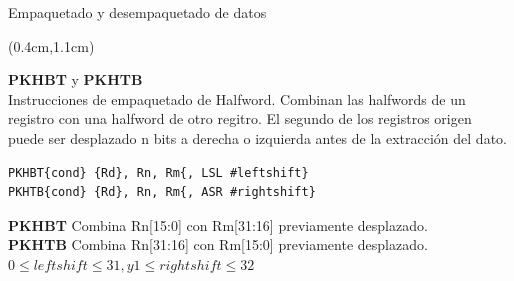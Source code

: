 \begin{frame}[fragile]{Empaquetado y desempaquetado de datos}
 \begin{textblock*}{\textwidth}(0.4cm,1.1cm)
  \begin{tcolorbox}[enhanced jigsaw,rounded corners, drop fuzzy shadow=ShadowColor]
    \textbf{PKHBT} y \textbf{PKHTB}\\
Instrucciones de empaquetado de Halfword. Combinan las halfwords de un registro con una halfword de otro regitro. El segundo de los registros origen puede ser desplazado n bits a derecha o izquierda antes de la extracción del dato.
\begin{lstlisting}[basicstyle=\scriptsize,numbers=none]
PKHBT{cond} {Rd}, Rn, Rm{, LSL #leftshift}
PKHTB{cond} {Rd}, Rn, Rm{, ASR #rightshift}
\end{lstlisting}
\textbf{PKHBT} Combina Rn[15:0] con Rm[31:16] previamente desplazado.\\
\textbf{PKHTB} Combina Rn[31:16] con Rm[15:0] previamente desplazado.\\
$ 0 \leq leftshift \leq 31, y 1 \leq rightshift \leq 32$
  \end{tcolorbox}
 \end{textblock*} 
\end{frame}

